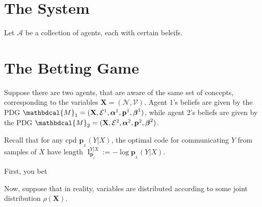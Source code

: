 \documentclass[twoside]{article} %
\theoremstyle{plain}
\theoremstyle{definition}
\DeclareMathOperator{\I}{\mathrm{I}} %
\newcommand{\mat}[1]{\mathbf{#1}}
\newcommand{\ssub}[1]{_{\!_{#1}\!}}
\newcommand{\bp}[1][L]{\mat{p}\ssub{#1}}
\newcommand{\V}{\mathcal V}
\newcommand{\N}{\mathcal N}
\newcommand{\Ed}{\mathcal E}
\newcommand{\balpha}{\boldsymbol\alpha}
\newcommand{\bbeta}{\boldsymbol\beta}
\newcommand{\dg}[1]{\mathbdcal{#1}}
\newcommand{\TODO}[1][INCOMPLETE]{{\centering\Large\color{red}$\langle$~\texttt{#1}~$\rangle$\par}}
\begin{document}

\section{The System}
    Let $\mathcal A$ be a collection of agents, each with certain beleifs. 
    
    
\section{The Betting Game}
    Suppose there are two agents, that are aware of the same set of concepts, corresponding to the variables $\mathbf X = (\N, \V)$. 
    Agent 1's beliefs are given by the PDG 
    $\dg M_1 = (\mat X, \Ed^1,\balpha^1, \mat p^1, \bbeta^1)$,
    while agent 2's beliefs are given by the PDG
    $\dg M_2 = (\mat X, \Ed^2,\balpha^2, \mat p^2, \bbeta^2)$.
    
    Recall that for any cpd $\bp(Y|X)$, the optimal code for communicating $Y$ from samples of $X$ have length $\I^{Y|X}_{\bp} := - \log {\bp(Y|X)}$.
    
    First, you bet
    
    Now, suppose that in reality, variables are distributed according to some joint distribution $\rho(\mathbf X)$. 
     
     

\appendix



\section{}

% 
% 
\end{document}
